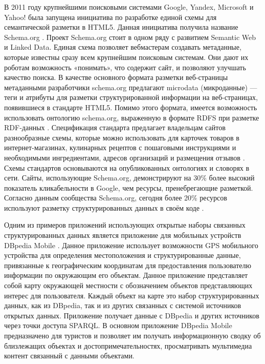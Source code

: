 В 2011 году крупнейшими поисковыми системами Google, Yandex, Microsoft и Yahoo! была запущена инициатива по разработке единой схемы для семантической разметки в HTML5. Данная инициатива получила название Schema.org \cite{ronallo2012html5}. Проект Schema.org стоит в одном ряду с развитием Semantic Web и Linked Data. Единая схема позволяет вебмастерам создавать метаданные, которые известны сразу всем крупнейшим поисковым системам. Они дают их роботам возможность «понимать», что содержит сайт, и позволяют улучшать качество поиска. В качестве основного формата разметки веб-страницы метаданными разработчики schema.org предлагают microdata (микроданные) — теги и атрибуты для разметки структурированной информации на веб-страницах, появившиеся в стандарте HTML5. Помимо этого формата, имеется возможность использовать онтологию schema.org, выраженную в формате RDFS при разметке RDF-данных . Спецификация стандарта предлагает владельцам сайтов разнообразные схемы, которые можно использовать для карточек товаров в интернет-магазинах, кулинарных рецептов с пошаговыми инструкциями и необходимыми ингредиентами, адресов организаций и размещения отзывов \cite{barker2014learning}. Схемы стандартов основываются на опубликованных онтологиях и словорях в сети. Сайты, использующие Schema.org, демонстрируют на 30\% более высокий показатель кликабельности в Google, чем ресурсы, пренебрегающие разметкой. Согласно данным сообщества Schema.org, сегодня более 20\% ресурсов используют разметку структурированных данных в своём коде \cite{patel2014analyzing}.


Одним из примеров приложений использующих открытые наборы связанных структурированных данных является приложение для мобильных устройств DBpedia Mobile \cite{becker2008dbpedia}. Данное приложение использует возможности GPS мобильного устройства для определения местоположения и структурированные данные, привязанные к географическим координатам для предоставления пользователю информации по окружающим его объектам. Данное приложение представляет собой карту окружающей местности с обозначением объектов представляющих интерес для пользователя. Каждый объект на карте это набор структурированных данных, как из DBpedia, так и из других связанных с системой источников открытых данных. Приложение получает данные с DBpedia и других источников через точки доступа SPARQL. В основном приложение DBpedia Mobile предназначено для туристов и позволяет им получать информационную сводку об близлежащих объектах и достопримечательностях, просматривать мультимедиа контент связанный с данными объектами. 

